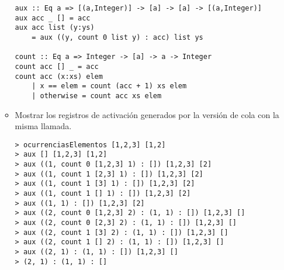 \documentclass[12pt,letterpaper]{article}
\begin{document}
\begin{enumerate}
\begin{itemize}
\begin{verbatim}
aux :: Eq a => [(a,Integer)] -> [a] -> [a] -> [(a,Integer)]
aux acc _ [] = acc
aux acc list (y:ys)
    = aux ((y, count 0 list y) : acc) list ys

count :: Eq a => Integer -> [a] -> a -> Integer
count acc [] _ = acc
count acc (x:xs) elem
    | x == elem = count (acc + 1) xs elem
    | otherwise = count acc xs elem
\end{verbatim}
        \item Mostrar los registros de activación generados por la versión de cola con la misma llamada.
\begin{verbatim}
> ocurrenciasElementos [1,2,3] [1,2]
> aux [] [1,2,3] [1,2]
> aux ((1, count 0 [1,2,3] 1) : []) [1,2,3] [2]
> aux ((1, count 1 [2,3] 1) : []) [1,2,3] [2]
> aux ((1, count 1 [3] 1) : []) [1,2,3] [2]
> aux ((1, count 1 [] 1) : []) [1,2,3] [2]
> aux ((1, 1) : []) [1,2,3] [2]
> aux ((2, count 0 [1,2,3] 2) : (1, 1) : []) [1,2,3] []
> aux ((2, count 0 [2,3] 2) : (1, 1) : []) [1,2,3] []
> aux ((2, count 1 [3] 2) : (1, 1) : []) [1,2,3] []
> aux ((2, count 1 [] 2) : (1, 1) : []) [1,2,3] []
> aux ((2, 1) : (1, 1) : []) [1,2,3] []
> (2, 1) : (1, 1) : []
\end{verbatim}
    \end{itemize}
\end{enumerate}
\end{document}
